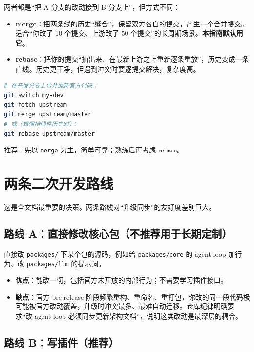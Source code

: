 \documentclass[11pt]{ctexart}
\newcommand{\code}[1]{\texttt{\small #1}}
\begin{document}
两者都是“把 A 分支的改动接到 B 分支上”，但方式不同：

\begin{itemize}[itemsep=1pt]
  \item \textbf{merge}：把两条线的历史“缝合”，保留双方各自的提交，产生一个合并提交。适合“你改了 10 个提交、上游改了 50 个提交”的长周期场景。\textbf{本指南默认用它}。
  \item \textbf{rebase}：把你的提交“抽出来、在最新上游之上重新逐条重放”，历史变成一条直线。历史更干净，但遇到冲突时要逐提交解决，复杂度高。
\end{itemize}

\begin{lstlisting}[language=bash]
# 在开发分支上合并最新官方代码：
git switch my-dev
git fetch upstream
git merge upstream/master
# 或（想保持线性历史时）：
git rebase upstream/master
\end{lstlisting}

\noindent 推荐：先以 \code{merge} 为主，简单可靠；熟练后再考虑 rebase。

\section{两条二次开发路线}

这是全文档最重要的决策。两条路线对“升级同步”的友好度差别巨大。

\subsection{路线 A：直接修改核心包（不推荐用于长期定制）}

直接改 \code{packages/} 下某个包的源码，例如给 \code{packages/core} 的 agent-loop 加行为、改 \code{packages/llm} 的提示词。

\begin{itemize}[itemsep=1pt]
  \item \textbf{优点}：能改一切，包括官方未开放的内部行为；不需要学习插件接口。
  \item \textbf{缺点}：官方 pre-release 阶段频繁重构、重命名、重打包，你改的同一段代码极可能被官方改动覆盖，升级时冲突最多、最难自动迁移。仓库纪律明确要求“改 agent-loop 必须同步更新架构文档”，说明这类改动是最深层的耦合。
\end{itemize}

\subsection{路线 B：写插件（推荐）}
\end{document}

